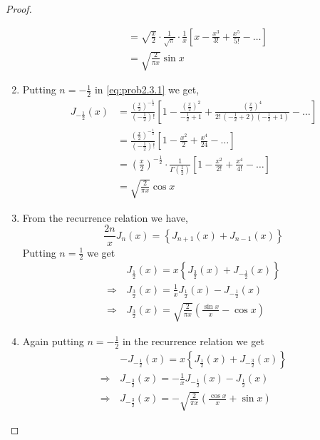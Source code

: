 \documentclass[../main-sheet.tex]{subfiles}
\begin{document}
\begin{proof}
\begin{enumerate}[label={(\roman*)}]
\begin{align*}
            &=\sqrt{\frac{x}{2}}\cdot\frac{1}{\sqrt{\pi}}\cdot\frac{1}{x} \left[x-\frac{x^3}{3!}+\frac{x^5}{5!}-\dots \right]\\
            &=\sqrt{\frac{2}{\pi x}}\sin x 
        \end{align*}
        \item Putting $ n=-\frac{1}{2} $ in \eqref{eq:prob2.3.1} we get,
        \begin{align*}
            J_{-\frac{1}{2}}(x )&=\frac{\left( \frac{x}{2} \right)^{-\frac{1}{2}}}{\left(- \frac{1}{2} \right)!} \left[ 1-\frac{\left( \frac{x}{2} \right)^2}{-\frac{1}{2}+1}+\frac{\left( \frac{x}{2} \right)^4}{2!\,\left(-\frac{1}{2}+2\right)\left({-\frac{1}{2}}+1\right)}-\dots \right]\\
            &=\frac{\left( \frac{x}{2} \right)^{-\frac{1}{2}}}{\left( -\frac{1}{2} \right)!} \left[ 1-\frac{x^2}{2}+\frac{x^4}{24}-\dots \right]\\
            &=\left(\frac{x}{2}\right)^{-\frac{1}{2}}\cdot\frac{1}{\Gamma\left( \frac{1}{2}   \right)} \left[ 1-\frac{x^2}{2!}+\frac{x^4}{4!}-\dots \right]\\
            &=\sqrt{\frac{2}{\pi x}}\cos x 
        \end{align*}
        \item From the recurrence relation we have,
        \[
            \frac{2n}{x}J_n(x)=\left\{ J_{n+1}(x)+J_{n-1}(x)\right\}
        \]
        Putting $ n=\frac{1}{2} $ we get
        \begin{align*}
            & J_{\frac{1}{2}}(x)=x\left\{ J_{\frac{3}{2}}(x)+J_{-\frac{1}{2}}(x)\right\}\\
            \Rightarrow\, & J_{\frac{3}{2}}(x)=\frac{1}{x} J_{\frac{1}{2}}(x)-J_{-\frac{1}{2}}(x)\\
            \Rightarrow\, & J_{\frac{3}{2}}(x)=\sqrt{\frac{2}{\pi x}}\left( \frac{\sin x}{x}-\cos x \right)
        \end{align*}
        \item Again putting $ n=-\frac{1}{2} $ in the recurrence relation we get
        \begin{align*}
            & -J_{-\frac{1}{2}}(x)=x\left\{ J_{\frac{1}{2}}(x)+J_{-\frac{3}{2}}(x)\right\}\\
            \Rightarrow\, & J_{-\frac{3}{2}}(x)=-\frac{1}{x} J_{-\frac{1}{2}}(x)-J_{\frac{1}{2}}(x)\\
            \Rightarrow\, & J_{-\frac{3}{2}}(x)=-\sqrt{\frac{2}{\pi x}}\left( \frac{\cos x}{x}+\sin x \right)
        \end{align*}
    \end{enumerate}
\end{proof}
\end{document}
